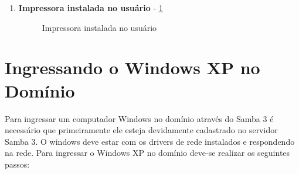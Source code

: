 \begin{enumerate}
	
	\item \textbf{Impressora instalada no usuário} - \ref{impressora_compartilhada}
	\begin{figure}[ht]
	   	\centering
	   	\caption{Impressora instalada no usuário}
	    \label{impressora_compartilhada}
	\end{figure}
	
\end{enumerate}


\section{Ingressando o Windows XP no Domínio}

Para ingressar um computador Windows no domínio através do Samba 3 é necessário que primeiramente ele esteja devidamente cadastrado no servidor Samba 3. O windows deve estar com os drivers de rede instalados e respondendo na rede.
Para ingressar o Windows XP no domínio deve-se realizar os seguintes passos:


